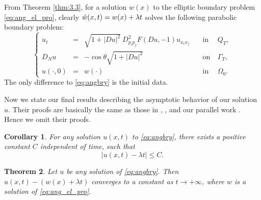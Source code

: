 \documentclass[12pt]{article}
\numberwithin{equation}{section}
\theoremstyle{plain}
\newtheorem{theorem}{Theorem}[section]
\newtheorem{corollary}[theorem]{Corollary}
\theoremstyle{definition}
\theoremstyle{remark}
\begin{document}
From Theorem \ref{thm:3.3}, for a solution $w(x)$ to the elliptic boundary problem \eqref{eq:ang_el_pro}, clearly $\Tilde{w}(x,t) = w(x) + \lambda t$ solves the following parabolic boundary problem:
\begin{equation} \label{eq:ang_transol}
    \left\{ \begin{array}{cllcl}
            u_t & = & \sqrt{1+|Du|^2} \  D^2_{p_i p_j} F (Du,-1) u_{x_i x_j}   \quad &  \text{in} & \ {Q}_T , \\
            D_N u & = & -  \cos \theta \sqrt{1+|Du|^2}  \quad &  \text{on} & \ \Gamma_T ,  \\
         u(\cdot,0) & = & w(\cdot)  \quad \ & \text{in} & \ \Omega_0.
    \end{array}  \right.
\end{equation}
The only difference to \eqref{eq:angbry} is the initial data.

Now we state our final results describing the asymptotic behavior of our solution $u$.  
Their proofs are basically the same as those in \cite{AW2}, \cite{GMWW}, and 
our parallel work \cite{CY1}. Hence we omit their proofs.
\begin{corollary} \label{cor:3.4}
    For any solution $u(x,t)$ to \eqref{eq:angbry}, there exists a positive constant $C$ independent of time, such that
    \begin{equation*}
        |u(x,t)-\lambda t| \leq C.
    \end{equation*}
\end{corollary}


\begin{theorem} 
    Let $u$ be any solution of \eqref{eq:angbry}. Then
    $u(x,t)-(w(x)+\lambda t)$ converges to a constant as $t\longrightarrow+\infty$, where $w$ is a solution of \eqref{eq:ang_el_pro}.
\end{theorem}
\end{document}
